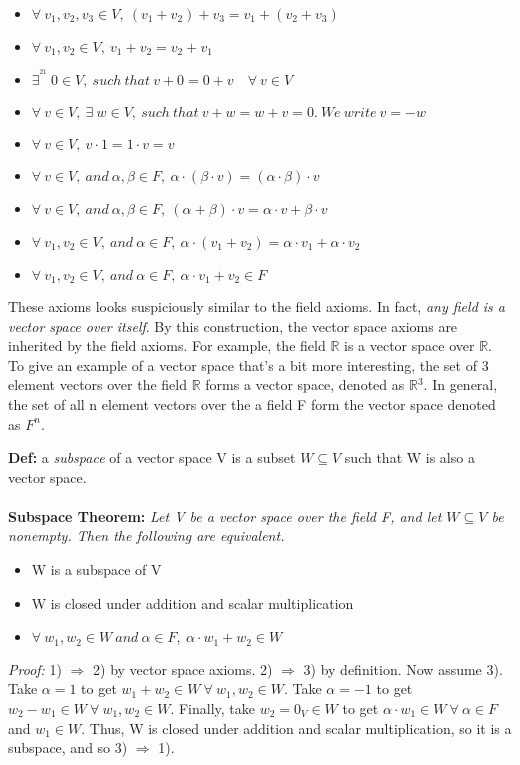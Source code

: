 \documentclass[12pt]{article}
\begin{document}
\begin{itemize}
\item $\forall\ v_1, v_2, v_3 \in V,\ (v_1 + v_2) + v_3 = v_1 + (v_2 + v_3)$
\item $\forall\ v_1, v_2 \in V,\ v_1 + v_2 = v_2 + v_1$
\item $\exists ^^21 \ 0 \in V,\ such\ that\ v + 0 = 0 + v\quad \forall\ v \in V$
\item $\forall\ v \in V,\ \exists\ w \in V,\ such\ that\ v + w = w + v = 0.\ We\ write\ v = -w$
\item $\forall\ v \in V,\ v \cdot 1 = 1 \cdot v = v$
\item $\forall\ v \in V,\ and\ \alpha,\beta \in F,\ \alpha \cdot (\beta \cdot v) = (\alpha \cdot \beta) \cdot v$
\item $\forall\ v \in V,\ and\ \alpha,\beta \in F,\ (\alpha + \beta) \cdot v = \alpha \cdot v + \beta \cdot v$
\item $\forall\ v_1, v_2 \in V,\ and\ \alpha \in F,\ \alpha \cdot (v_1 + v_2) = \alpha \cdot v_1 + \alpha \cdot v_2$
\item $\forall\ v_1, v_2 \in V,\ and\ \alpha \in F,\ \alpha \cdot v_1 + v_2 \in F$
\end{itemize}
These axioms looks suspiciously similar to the field axioms. In fact, \emph{any field is a vector space over itself}. By this construction, the vector space axioms are inherited by the field axioms. For example, the field $\mathbb{R}$ is a vector space over $\mathbb{R}$. To give an example of a vector space that's a bit more interesting, the set of 3 element vectors over the field $\mathbb{R}$ forms a vector space, denoted as $\mathbb{R}$$^3$. In general, the set of all n element vectors over the a field F form the vector space denoted as $F^n$.

\textbf{Def: }a \emph{subspace} of a vector space V is a subset $W \subseteq V$ such that W is also a vector space.\\\\
\textbf{Subspace Theorem: } \emph{Let V be a vector space over the field F, and let $W \subseteq V$ be nonempty. Then the following are equivalent.}
\begin{itemize}
\item W is a subspace of V
\item W is closed under addition and scalar multiplication
\item $\forall\ w_1, w_2 \in W\ and\ \alpha \in F,\ \alpha \cdot w_1 + w_2 \in W$
\end{itemize}
\emph{Proof: }1) $\Rightarrow$ 2) by vector space axioms. 2) $\Rightarrow$ 3)  by definition. Now assume 3). Take $\alpha = 1$ to get $w_1 + w_2 \in W\ \forall\ w_1, w_2 \in W$. Take $\alpha = -1$ to get $w_2 - w_1 \in W\ \forall\ w_1, w_2 \in W$. Finally, take $w_2 = 0_V \in W$ to get $\alpha \cdot w_1 \in W\ \forall\ \alpha \in F$ and $w_1 \in W$. Thus, W is closed under addition and scalar multiplication, so it is a subspace, and so 3) $\Rightarrow$ 1).\\
\end{document}
